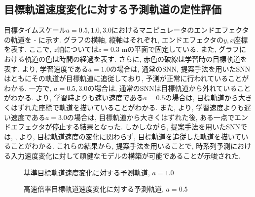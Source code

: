 \subsection{目標軌道速度変化に対する予測軌道の定性評価}
目標タイムスケール$a=0.5, 1.0, 3.0$におけるマニピュレータのエンドエフェクタの軌道を - に示す.
グラフの横軸, 縦軸はそれぞれ, エンドエフェクタの$y, x$座標を表す.
ここで, $z$軸については$z=0.3$ mの平面で固定している.
また, グラフにおける軌道の色は時間の経過を表す.
さらに, 赤色の破線は学習時の目標軌道を表す.
より, 学習速度である$a=1.0$の場合は, 通常のSNN, 提案手法を用いたSNNはともにその軌道が目標軌道に追従しており, 予測が正常に行われていることがわかる.
一方で, $a=0.5, 3.0$の場合は, 通常のSNNは目標軌道から外れていることがわかる.
より, 学習時よりも速い速度である$a=0.5$の場合は, 目標軌道から大きくはずれた座標で軌道を描いていることがわかる.
また, より, 学習速度よりも遅い速度である$a=3.0$の場合は, 目標軌道から大きくはずれた後, ある一点でエンドエフェクタが停止する結果となった.
しかしながら, 提案手法を用いたSNNでは, , より, 目標軌道速度の変化に関わらず, 目標軌道を追従した軌道を描いていることがわかる.
これらの結果から, 提案手法を用いることで, 時系列予測における入力速度変化に対して頑健なモデルの構築が可能であることが示唆された.
\begin{figure}[htb]
    \centering

    \begin{minipage}{1.0\textwidth}
        \centering
        
    \end{minipage}

    \begin{minipage}{1.0\textwidth}
        \centering
        
    \end{minipage}

    \caption{基準目標軌道速度変化に対する予測軌道, $a=1.0$}
    \label{fig:result3:3:a1.0}
\end{figure}

\begin{figure}[htb]
    \centering
    \begin{minipage}{1.0\textwidth}
        \centering
        
        \label{fig:result3:3:a0.5:snn}
    \end{minipage}

    \begin{minipage}{1.0\textwidth}
        \centering
        
        \label{fig:result3:3:a0.5:dyna}
    \end{minipage}

    \caption{高速倍率目標軌道速度変化に対する予測軌道, $a=0.5$}
    \label{fig:result3:3:a0.5}
\end{figure}


